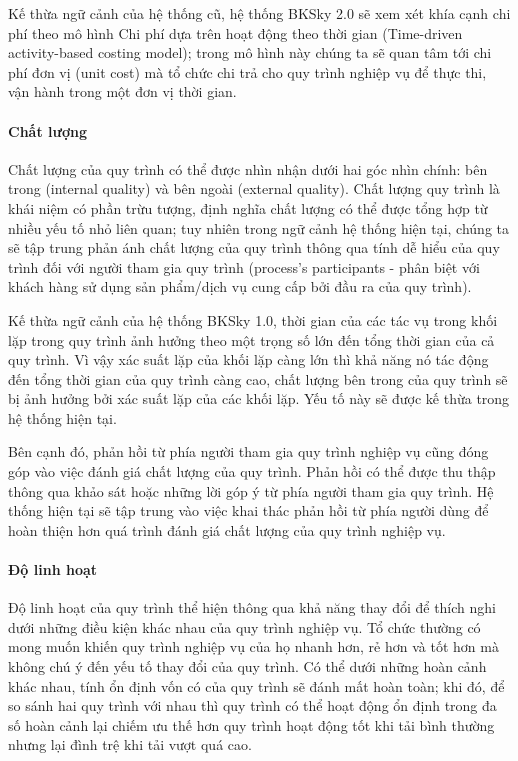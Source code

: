     Kế thừa ngữ cảnh của hệ thống cũ, hệ thống BKSky 2.0 sẽ xem xét khía cạnh chi phí theo mô hình Chi phí dựa trên hoạt động theo thời gian (Time-driven activity-based costing model); trong mô hình này chúng ta sẽ quan tâm tới chi phí đơn vị (unit cost) mà tổ chức chi trả cho quy trình nghiệp vụ để thực thi, vận hành trong một đơn vị thời gian.
    
    \paragraph{Chất lượng}\mbox{}

    Chất lượng của quy trình có thể được nhìn nhận dưới hai góc nhìn chính: bên trong (internal quality) và bên ngoài (external quality). Chất lượng quy trình là khái niệm có phần trừu tượng, định nghĩa chất lượng có thể được tổng hợp từ nhiều yếu tố nhỏ liên quan; tuy nhiên trong ngữ cảnh hệ thống hiện tại, chúng ta sẽ tập trung phản ánh chất lượng của quy trình thông qua tính dễ hiểu của quy trình đối với người tham gia quy trình (process's participants - phân biệt với khách hàng sử dụng sản phẩm/dịch vụ cung cấp bởi đầu ra của quy trình).
    
    Kế thừa ngữ cảnh của hệ thống BKSky 1.0, thời gian của các tác vụ trong khối lặp trong quy trình ảnh hưởng theo một trọng số lớn đến tổng thời gian của cả quy trình. Vì vậy xác suất lặp của khối lặp càng lớn thì khả năng nó tác động đến tổng thời gian của quy trình càng cao, chất lượng bên trong của quy trình sẽ bị ảnh hưởng bởi xác suất lặp của các khối lặp. Yếu tố này sẽ được kế thừa trong hệ thống hiện tại.

    Bên cạnh đó, phản hồi từ phía người tham gia quy trình nghiệp vụ cũng đóng góp vào việc đánh giá chất lượng của quy trình. Phản hồi có thể được thu thập thông qua khảo sát hoặc những lời góp ý từ phía người tham gia quy trình. Hệ thống hiện tại sẽ tập trung vào việc khai thác phản hồi từ phía người dùng để hoàn thiện hơn quá trình đánh giá chất lượng của quy trình nghiệp vụ.
    
    \paragraph{Độ linh hoạt}\mbox{}

    Độ linh hoạt của quy trình thể hiện thông qua khả năng thay đổi để thích nghi dưới những điều kiện khác nhau của quy trình nghiệp vụ. Tổ chức thường có mong muốn khiến quy trình nghiệp vụ của họ nhanh hơn, rẻ hơn và tốt hơn mà không chú ý đến yếu tố thay đổi của quy trình. Có thể dưới những hoàn cảnh khác nhau, tính ổn định vốn có của quy trình sẽ đánh mất hoàn toàn; khi đó, để so sánh hai quy trình với nhau thì quy trình có thể hoạt động ổn định trong đa số hoàn cảnh lại chiếm ưu thế hơn quy trình hoạt động tốt khi tải bình thường nhưng lại đình trệ khi tải vượt quá cao.

